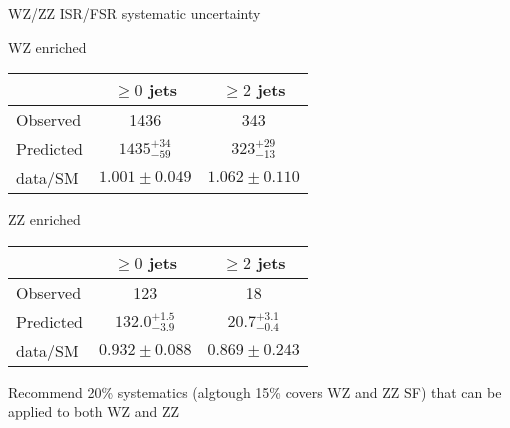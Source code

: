\documentclass[10pt]{beamer}
\begin{document}
\begin{frame}{WZ/ZZ ISR/FSR systematic uncertainty}
\begin{block}{WZ enriched}
  
\begin{table}
\begin{center} 
\begin{tabular}{l|c|c}
\hline \hline
     & $\ge 0$ jets & $\ge 2$ jets  \\ 
\hline
Observed & 1436 &  343 \\
\hline
Predicted  & $1435^{+34}_{-59} $ & $323^{+29}_{-13} $  \\
\hline
data/SM & $1.001\pm0.049$ & $1.062\pm0.110$ \\
\hline \hline
\end{tabular}
\end{center}
\end{table}
\end{block}

\begin{block}{ZZ enriched}

\begin{table}
\begin{center} 
\begin{tabular}{l|c|c}
\hline \hline
     & $\ge 0$ jets & $\ge 2$ jets  \\ 
\hline
Observed & 123 &  18 \\
\hline
Predicted  & $132.0^{+1.5}_{-3.9} $ & $20.7^{+3.1}_{-0.4} $  \\
\hline
data/SM & $0.932\pm0.088$ & $0.869\pm0.243$ \\
\hline \hline
\end{tabular}
\end{center}
\end{table}
\end{block}

Recommend 20\% systematics (algtough 15\% covers WZ and ZZ SF) that can be applied to both WZ and ZZ

\end{frame}





\end{document}
